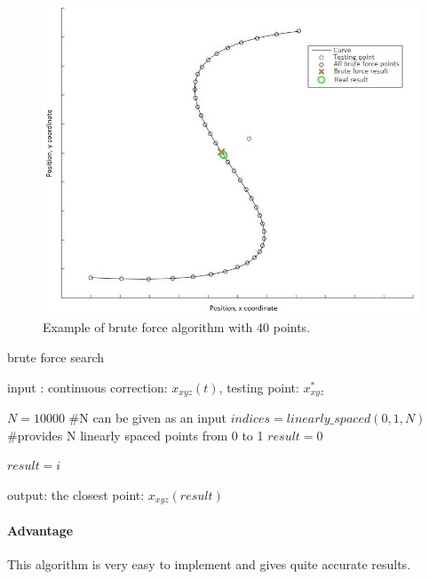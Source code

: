 \begin{figure}[H]
\centering
\includegraphics[width=13cm]{img/brute_force.jpg}
\caption{Example of brute force algorithm with 40 points.}
\end{figure}

\begin{algorithm}[H]
  \caption{brute force search}
  \label{bf_algo}
  \begin{algorithmic}

      \STATE input : continuous correction: $x_{xyz}(t)$, testing point: $x_{xyz}^*$
      \STATE

      \STATE $N = 10000$  \#N can be given as an input
      \STATE $indices = linearly\_spaced(0,1,N)$ \#provides N linearly spaced points from 0 to 1
      \STATE $result = 0$
      \STATE

                \STATE $result = i$
            \ENDIF
        \ENDFOR

        \STATE
        \STATE output: the closest point: $x_{xyz}(result)$

    \end{algorithmic}
\end{algorithm}

\paragraph*{Advantage}

This algorithm is very easy to implement and gives quite accurate results.


